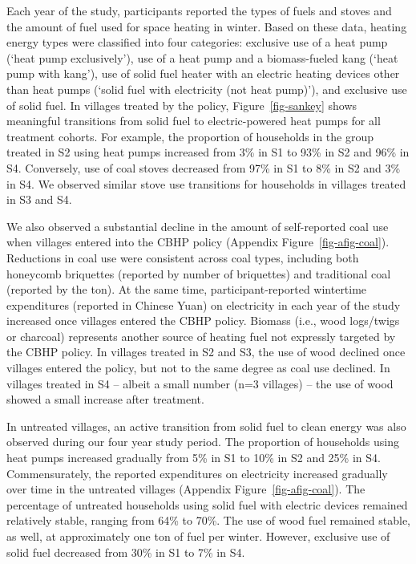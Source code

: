 \documentclass[
  letterpaper,
  DIV=11,
  numbers=noendperiod]{scrartcl}
\begin{document}
Each year of the study, participants reported the types of fuels and
stoves and the amount of fuel used for space heating in winter. Based on
these data, heating energy types were classified into four categories:
exclusive use of a heat pump (`heat pump exclusively'), use of a heat
pump and a biomass-fueled kang (`heat pump with kang'), use of solid
fuel heater with an electric heating devices other than heat pumps
(`solid fuel with electricity (not heat pump)'), and exclusive use of
solid fuel. In villages treated by the policy, Figure~\ref{fig-sankey}
shows meaningful transitions from solid fuel to electric-powered heat
pumps for all treatment cohorts. For example, the proportion of
households in the group treated in S2 using heat pumps increased from
3\% in S1 to 93\% in S2 and 96\% in S4. Conversely, use of coal stoves
decreased from 97\% in S1 to 8\% in S2 and 3\% in S4. We observed
similar stove use transitions for households in villages treated in S3
and S4.

We also observed a substantial decline in the amount of self-reported
coal use when villages entered into the CBHP policy (Appendix
Figure~\ref{fig-afig-coal}). Reductions in coal use were consistent
across coal types, including both honeycomb briquettes (reported by
number of briquettes) and traditional coal (reported by the ton). At the
same time, participant-reported wintertime expenditures (reported in
Chinese Yuan) on electricity in each year of the study increased once
villages entered the CBHP policy. Biomass (i.e., wood logs/twigs or
charcoal) represents another source of heating fuel not expressly
targeted by the CBHP policy. In villages treated in S2 and S3, the use
of wood declined once villages entered the policy, but not to the same
degree as coal use declined. In villages treated in S4 -- albeit a small
number (n=3 villages) -- the use of wood showed a small increase after
treatment.

In untreated villages, an active transition from solid fuel to clean
energy was also observed during our four year study period. The
proportion of households using heat pumps increased gradually from 5\%
in S1 to 10\% in S2 and 25\% in S4. Commensurately, the reported
expenditures on electricity increased gradually over time in the
untreated villages (Appendix Figure~\ref{fig-afig-coal}). The percentage
of untreated households using solid fuel with electric devices remained
relatively stable, ranging from 64\% to 70\%. The use of wood fuel
remained stable, as well, at approximately one ton of fuel per winter.
However, exclusive use of solid fuel decreased from 30\% in S1 to 7\% in
S4.
\end{document}
